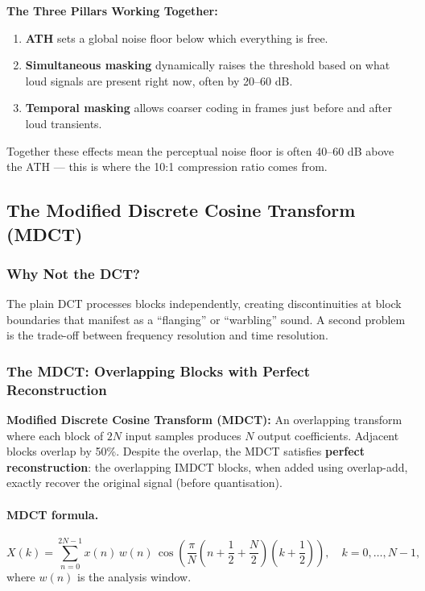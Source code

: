 \begin{importantbox}
\textbf{The Three Pillars Working Together:}
\begin{enumerate}[nosep]
  \item \textbf{ATH} sets a global noise floor below which everything is free.
  \item \textbf{Simultaneous masking} dynamically raises the threshold based on what loud signals are present right now, often by 20--60 dB.
  \item \textbf{Temporal masking} allows coarser coding in frames just before and after loud transients.
\end{enumerate}
Together these effects mean the perceptual noise floor is often 40--60 dB above the ATH --- this is where the 10:1 compression ratio comes from.
\end{importantbox}

\subsection{The Modified Discrete Cosine Transform (MDCT)}

\subsubsection{Why Not the DCT?}

The plain DCT processes blocks independently, creating discontinuities at block boundaries that manifest as a ``flanging'' or ``warbling'' sound. A second problem is the trade-off between frequency resolution and time resolution.

\subsubsection{The MDCT: Overlapping Blocks with Perfect Reconstruction}

\begin{definitionbox}
\textbf{Modified Discrete Cosine Transform (MDCT):} An overlapping transform where each block of $2N$ input samples produces $N$ output coefficients. Adjacent blocks overlap by 50\%. Despite the overlap, the MDCT satisfies \textbf{perfect reconstruction}: the overlapping IMDCT blocks, when added using overlap-add, exactly recover the original signal (before quantisation).
\end{definitionbox}

\paragraph{MDCT formula.}
\begin{equation}
X(k) = \sum_{n=0}^{2N-1} x(n)\,w(n)\, \cos\!\left(\frac{\pi}{N}\!\left(n+\frac{1}{2}+\frac{N}{2}\right) \left(k+\frac{1}{2}\right)\right), \quad k=0,\ldots,N-1,
\label{eq:mdct}
\end{equation}
where $w(n)$ is the analysis window.

